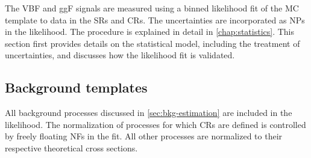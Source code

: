 
The VBF and ggF signals are measured using a binned likelihood fit of the MC template to data in the SRs and CRs. The uncertainties are incorporated as NPs in the likelihood. The procedure is explained in detail in \cref{chap:statistics}. 
This section first provides details on the statistical model, including the treatment of uncertainties, and discusses how the likelihood fit is validated.

\subsection{Background templates}
All background processes discussed in \cref{sec:bkg-estimation} are included in the likelihood. 
The normalization of processes for which CRs are defined is controlled by freely floating NFs in the fit. All other processes are normalized to their respective theoretical cross sections.

